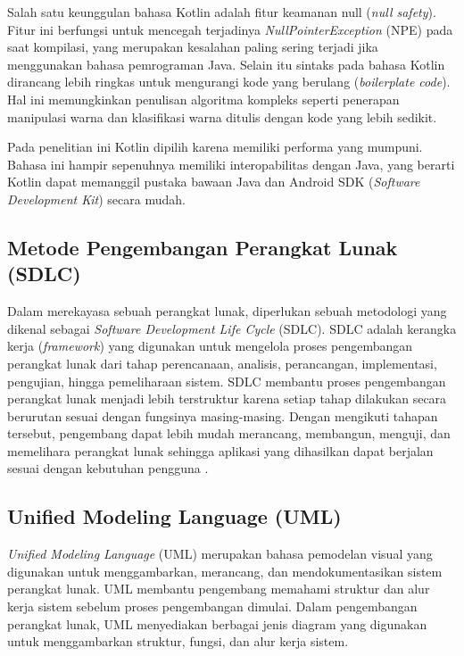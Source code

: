 Salah satu keunggulan bahasa Kotlin adalah fitur keamanan null (\textit{null safety}).
Fitur ini berfungsi untuk mencegah terjadinya \textit{NullPointerException} (NPE) pada saat kompilasi, yang merupakan kesalahan paling sering terjadi jika menggunakan bahasa pemrograman Java.
Selain itu sintaks pada bahasa Kotlin dirancang lebih ringkas untuk mengurangi kode yang berulang (\textit{boilerplate code}).
Hal ini memungkinkan penulisan algoritma kompleks seperti penerapan manipulasi warna dan klasifikasi warna ditulis dengan kode yang lebih sedikit. \parencite{kotlin_android_overview}

Pada penelitian ini Kotlin dipilih karena memiliki performa yang mumpuni.
Bahasa ini hampir sepenuhnya memiliki interopabilitas dengan Java, yang berarti Kotlin dapat memanggil pustaka bawaan Java dan Android SDK (\textit{Software Development Kit}) secara mudah.


\subsection{Metode Pengembangan Perangkat Lunak (SDLC)}
Dalam merekayasa sebuah perangkat lunak, diperlukan sebuah metodologi yang dikenal sebagai \textit{Software Development Life Cycle} (SDLC).
SDLC adalah kerangka kerja (\textit{framework}) yang digunakan untuk mengelola proses pengembangan perangkat lunak dari tahap perencanaan, analisis, perancangan, implementasi, pengujian, hingga pemeliharaan sistem.
SDLC membantu proses pengembangan perangkat lunak menjadi lebih terstruktur karena setiap tahap dilakukan secara berurutan sesuai dengan fungsinya masing-masing.
Dengan mengikuti tahapan tersebut, pengembang dapat lebih mudah merancang, membangun, menguji, dan memelihara perangkat lunak sehingga aplikasi yang dihasilkan dapat berjalan sesuai dengan kebutuhan pengguna \parencite{ibm_sdlc}.

\subsection{Unified Modeling Language (UML)}
\textit{Unified Modeling Language} (UML) merupakan bahasa pemodelan visual yang digunakan untuk menggambarkan, merancang, dan mendokumentasikan sistem perangkat lunak.
UML membantu pengembang memahami struktur dan alur kerja sistem sebelum proses pengembangan dimulai.
Dalam pengembangan perangkat lunak, UML menyediakan berbagai jenis diagram yang digunakan untuk menggambarkan struktur, fungsi, dan alur kerja sistem.

